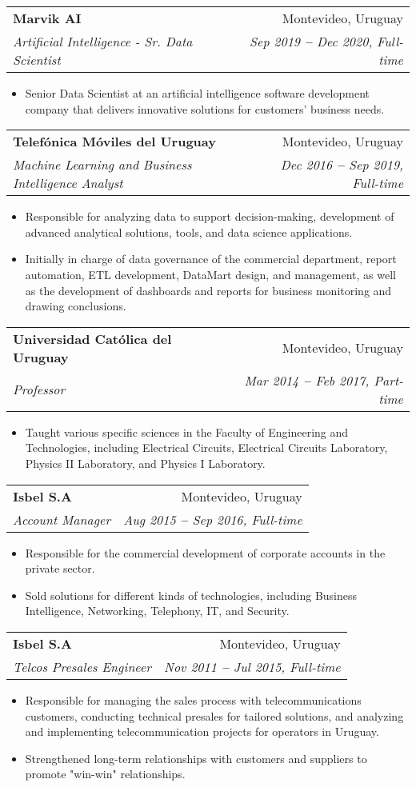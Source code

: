 \documentclass[letterpaper,11pt]{article}
\makeatletter
\newcommand{\resumeItem}[1]{
  \item\small{
    {#1 \vspace{-2pt}}
  }
}
\newcommand{\resumeSubheading}[4]{
  \vspace{-2pt}\item
  \begin{tabular*}{0.97\textwidth}[t]{l@{\extracolsep{\fill}}r}
    \textbf{#1} & #2 \\
    \textit{\small#3} & \textit{\small #4} \\
  \end{tabular*}\vspace{-7pt}
}
\newcommand{\resumeItemListStart}{\begin{itemize}}
\newcommand{\resumeItemListEnd}{\end{itemize}\vspace{-5pt}}
\makeatother
\begin{document}
        \resumeSubheading
            {Marvik AI}{Montevideo, Uruguay}
            {Artificial Intelligence - Sr. Data Scientist}{Sep 2019 \textbf{--} Dec 2020, Full-time}
            \resumeItemListStart
                \resumeItem{Senior Data Scientist at an artificial intelligence software development company that delivers innovative solutions for customers' business needs.}
            \resumeItemListEnd

        \resumeSubheading
            {Telefónica Móviles del Uruguay}{Montevideo, Uruguay}
            {Machine Learning and Business Intelligence Analyst}{Dec 2016 \textbf{--} Sep 2019, Full-time}
            \resumeItemListStart
                \resumeItem{Responsible for analyzing data to support decision-making, development of advanced analytical solutions, tools, and data science applications.}
                \resumeItem{Initially in charge of data governance of the commercial department, report automation, ETL development, DataMart design, and management, as well as the development of dashboards and reports for business monitoring and drawing conclusions.}
            \resumeItemListEnd

        \resumeSubheading
            {Universidad Católica del Uruguay}{Montevideo, Uruguay}
            {Professor}{Mar 2014 \textbf{--} Feb 2017, Part-time}
            \resumeItemListStart
                \resumeItem{Taught various specific sciences in the Faculty of Engineering and Technologies, including Electrical Circuits, Electrical Circuits Laboratory, Physics II Laboratory, and Physics I Laboratory.}
            \resumeItemListEnd
        
        \resumeSubheading
            {Isbel S.A}{Montevideo, Uruguay}
            {Account Manager}{Aug 2015 \textbf{--} Sep 2016, Full-time}
            \resumeItemListStart
                \resumeItem{ Responsible for the commercial development of corporate accounts in the private sector.}
                \resumeItem{Sold solutions for different kinds of technologies, including Business Intelligence, Networking, Telephony, IT, and Security.}
            \resumeItemListEnd

        \resumeSubheading
            {Isbel S.A}{Montevideo, Uruguay}
            {Telcos Presales Engineer}{Nov 2011 \textbf{--} Jul 2015, Full-time}
            \resumeItemListStart
                \resumeItem{Responsible for managing the sales process with telecommunications customers, conducting technical presales for tailored solutions, and analyzing and implementing telecommunication projects for operators in Uruguay.}
                \resumeItem{Strengthened long-term relationships with customers and suppliers to promote "win-win" relationships.}
            \resumeItemListEnd
    
\end{document}
